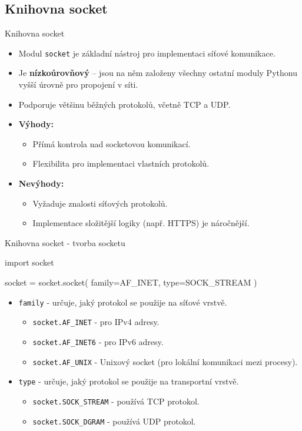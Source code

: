 \documentclass{beamer}
\begin{document}
\subsection{Knihovna socket}
\begin{frame}{Knihovna socket}
	\begin{itemize}
		\item Modul \texttt{socket} je základní nástroj pro implementaci síťové komunikace.
		\item Je \textbf{nízkoúrovňový} – jsou na něm založeny všechny ostatní moduly Pythonu vyšší úrovně pro propojení v síti.
		\item Podporuje většinu běžných protokolů, včetně TCP a UDP.
		\item \textbf{Výhody:}
		\begin{itemize}
			\item Přímá kontrola nad socketovou komunikací.
			\item Flexibilita pro implementaci vlastních protokolů.
		\end{itemize}
		\item \textbf{Nevýhody:}
		\begin{itemize}
			\item Vyžaduje znalosti síťových protokolů.
			\item Implementace složitější logiky (např. HTTPS) je náročnější.
		\end{itemize}
	\end{itemize}
\end{frame}

\begin{frame}{Knihovna socket - tvorba socketu}
    \begin{semiverbatim}
	import socket

    socket = socket.socket(
    	family=AF_INET,
    	type=SOCK_STREAM
    )
    \end{semiverbatim}
	\begin{itemize}
		\item \texttt{family}  - určuje, jaký protokol se použije na síťové vrstvě.
		\begin{itemize}
			\item \texttt{socket.AF\_INET} - pro IPv4 adresy.
			\item \texttt{socket.AF\_INET6} - pro IPv6 adresy.
			\item \texttt{socket.AF\_UNIX} - Unixový socket (pro lokální komunikaci mezi procesy).
		\end{itemize}
		\item \texttt{type} - určuje, jaký protokol se použije na transportní vrstvě.
		\begin{itemize}
			\item \texttt{socket.SOCK\_STREAM} - používá TCP protokol.
			\item \texttt{socket.SOCK\_DGRAM} - používá UDP protokol.
		\end{itemize}
	\end{itemize}
\end{frame}
\end{document}
